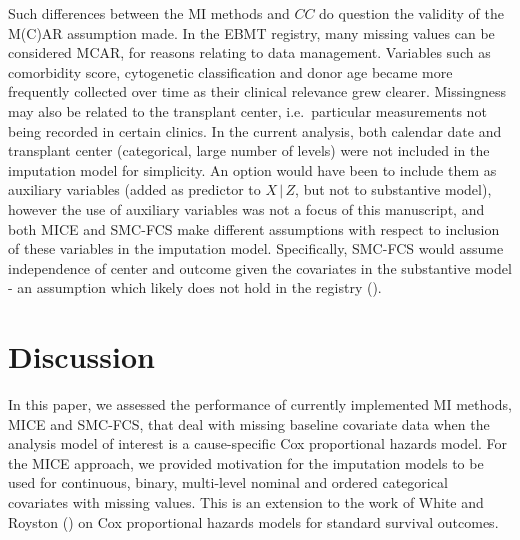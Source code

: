 \documentclass[
  letterpaper,
  DIV=11,
  numbers=noendperiod]{scrreprt}
\newcommand{\given}{\,|\,}
\begin{document}
Such differences between the MI methods and \(CC\) do question the
validity of the M(C)AR assumption made. In the EBMT registry, many
missing values can be considered MCAR, for reasons relating to data
management. Variables such as comorbidity score, cytogenetic
classification and donor age became more frequently collected over time
as their clinical relevance grew clearer. Missingness may also be
related to the transplant center, i.e.~particular measurements not being
recorded in certain clinics. In the current analysis, both calendar date
and transplant center (categorical, large number of levels) were not
included in the imputation model for simplicity. An option would have
been to include them as auxiliary variables (added as predictor to
\(X \given Z\), but not to substantive model), however the use of
auxiliary variables was not a focus of this manuscript, and both MICE
and SMC-FCS make different assumptions with respect to inclusion of
these variables in the imputation model. Specifically, SMC-FCS would
assume independence of center and outcome given the covariates in the
substantive model - an assumption which likely does not hold in the
registry ().

\section{Discussion}\label{sec-cs-MI-discussion}

In this paper, we assessed the performance of currently implemented MI
methods, MICE and SMC-FCS, that deal with missing baseline covariate
data when the analysis model of interest is a cause-specific Cox
proportional hazards model. For the MICE approach, we provided
motivation for the imputation models to be used for continuous, binary,
multi-level nominal and ordered categorical covariates with missing
values. This is an extension to the work of White and Royston
() on Cox
proportional hazards models for standard survival outcomes.
\end{document}
